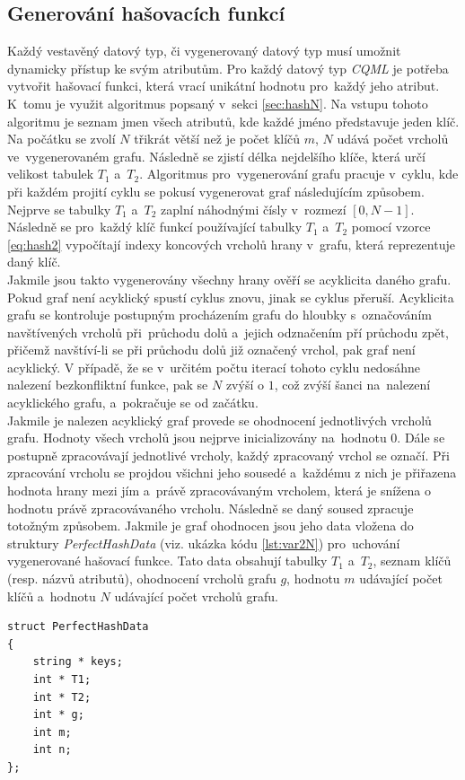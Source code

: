 \documentclass[11pt,twoside,a4paper]{book}
\begin{document}
\subsection{\label{SEC:hashN}Generování hašovacích funkcí}
Každý vestavěný datový typ, či vygenerovaný datový typ musí umožnit dynamicky přístup ke svým atributům.
Pro každý datový typ \textit{CQML} je potřeba vytvořit hašovací funkci, která vrací unikátní hodnotu pro~každý jeho atribut. K~tomu je využit algoritmus popsaný v~sekci \ref{sec:hashN}. Na vstupu tohoto algoritmu je seznam jmen všech atributů, kde každé jméno představuje jeden klíč. Na počátku se zvolí $N$ třikrát větší než je počet klíčů $m$, $N$ udává počet vrcholů ve~vygenerovaném grafu. Následně se zjistí délka nejdelšího klíče, která určí velikost tabulek $T_1$ a~$T_2$. Algoritmus pro~vygenerování grafu pracuje v~cyklu, kde při každém projití cyklu se pokusí vygenerovat graf následujícím způsobem.
Nejprve se tabulky $T_1$ a~$T_2$ zaplní náhodnými čísly v~rozmezí $[0,N-1]$. Následně se pro~každý klíč funkcí používající tabulky $T_1$ a~$T_2$ pomocí vzorce \ref{eq:hash2} vypočítají indexy koncových vrcholů hrany v~grafu, která reprezentuje daný klíč.\\
Jakmile jsou takto vygenerovány všechny hrany ověří se acyklicita daného grafu. Pokud graf není acyklický spustí cyklus znovu, jinak se cyklus přeruší. Acyklicita grafu se kontroluje postupným procházením grafu do hloubky s~označováním navštívených vrcholů při~průchodu dolů a~jejich odznačením pří průchodu zpět, přičemž navštíví-li se při průchodu dolů již označený vrchol, pak graf není acyklický.
V případě, že se v~určitém počtu iterací tohoto cyklu nedosáhne nalezení bezkonfliktní funkce, pak se $N$ zvýší o $1$, což zvýší šanci na~nalezení acyklického grafu, a~pokračuje se od začátku.\\
Jakmile je nalezen acyklický graf provede se ohodnocení jednotlivých vrcholů grafu. Hodnoty všech vrcholů jsou nejprve inicializovány na~hodnotu $0$. Dále se postupně zpracovávají jednotlivé vrcholy, každý zpracovaný vrchol se označí. Při zpracování vrcholu se projdou všichni jeho sousedé a~každému z nich je přiřazena hodnota hrany mezi jím a~právě zpracovávaným vrcholem, která je snížena o hodnotu právě zpracovávaného vrcholu. Následně se daný soused zpracuje totožným způsobem. Jakmile je graf ohodnocen jsou jeho data vložena do struktury \textit{PerfectHashData} (viz. ukázka kódu \ref{lst:var2N}) pro~uchování vygenerované hašovací funkce. Tato data obsahují tabulky $T_1$ a~$T_2$, seznam klíčů (resp. názvů atributů), ohodnocení vrcholů grafu $g$, hodnotu $m$ udávající počet klíčů a~hodnotu $N$ udávající počet vrcholů grafu.
\begin{lstlisting}[frame=single,caption=Struktura pro~uchování hašovací funkce.,label=lst:var2N]
struct PerfectHashData
{
	string * keys;
	int * T1;
	int * T2;
	int * g;
	int m;
	int n;
};
\end{lstlisting}
\end{document}
